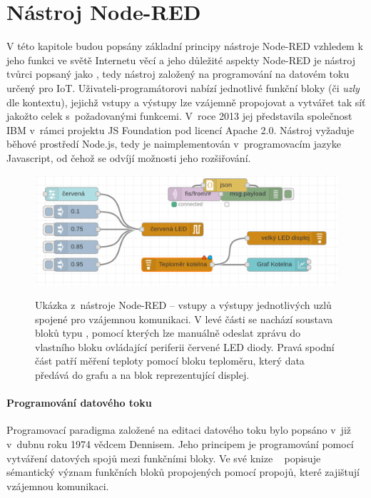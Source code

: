 \chapter{Nástroj Node-RED}
\label{ch:nastroj-node-red}

V této kapitole budou popsány základní principy nástroje Node-RED vzhledem k jeho funkci ve světě Internetu věcí a
jeho důležité aspekty
Node-RED je nástroj tvůrci popsaný jako , tedy nástroj založený na
programování na datovém toku určený pro IoT. Uživateli-programátorovi nabízí jednotlivé funkční bloky (či \emph{uzly}
dle kontextu),
jejichž vstupy a výstupy lze vzájemně propojovat a vytvářet tak síť jakožto celek s~požadovanými funkcemi.
V~roce 2013 jej představila společnost IBM v~rámci projektu JS Foundation pod licencí Apache 2.0. Nástroj vyžaduje
běhové prostředí Node.js, tedy je naimplementován v~programovacím jazyke Javascript, od čehož se odvíjí možnosti
jeho rozšiřování.

\begin{figure}
    \includegraphics[width=\textwidth]{figures/node-red-example.png}
    \label{fig:node-red-example}
    \caption{Ukázka z~nástroje Node-RED -- vstupy a výstupy jednotlivých uzlů spojené pro vzájemnou komunikaci.
    V levé části se nachází soustava bloků typu , pomocí kterých lze manuálně odeslat zprávu do vlastního
    bloku ovládající periferii červené LED diody.
    Pravá spodní část patří měření teploty pomocí bloku teploměru, který data předává do grafu a na blok
    reprezentující displej.}
\end{figure}

\subsubsection{Programování datového toku}
Programovací paradigma založené na editaci datového toku bylo popsáno v~již v~dubnu roku 1974 vědcem Dennisem. Jeho
principem je programování pomocí vytváření datových spojů mezi funkčními bloky.
Ve své knize ~\cite{FirstVersionOfDataflow} popisuje sémantický
význam funkčních bloků propojených pomocí propojů, které zajištují vzájemnou komunikaci. 

